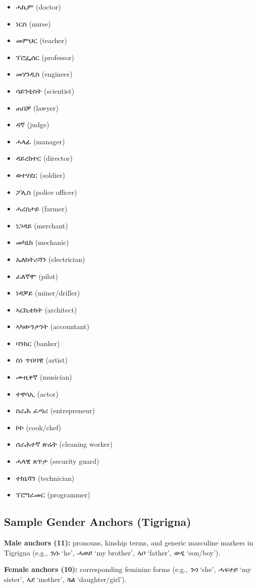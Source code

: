 \documentclass[10pt]{article}
\begin{document}
\begin{itemize}[noitemsep, leftmargin=*]
  \item ሓኪም (doctor)
  \item ነርስ (nurse)
  \item መምህር (teacher)
  \item ፕሮፌሰር (professor)
  \item መሃንዲስ (engineer)
  \item ሳይንቲስት (scientist)
  \item ጠበቓ (lawyer)
  \item ዳኛ (judge)
  \item ሓላፊ (manager)
  \item ዳይረክተር (director)
  \item ወተሃደር (soldier)
  \item ፖሊስ (police officer)
  \item ሓረስታይ (farmer)
  \item ነጋዳይ (merchant)
  \item መካኒክ (mechanic)
  \item ኤለክትሪሻን (electrician)
  \item ፈለኛሞ (pilot)
  \item ነዳቓይ (miner/driller)
  \item ኣርኪቴክት (architect)
  \item ኣካውንታንት (accountant)
  \item ባንከር (banker)
  \item ስነ ጥበባዊ (artist)
  \item ሙዚቀኛ (musician)
  \item ተዋሳኢ (actor)
  \item ስራሕ ፈጣሪ (entrepreneur)
  \item ኮኮ (cook/chef)
  \item ሰራሕተኛ ጽሬት (cleaning worker)
  \item ሓላዊ ጸጥታ (security guard)
  \item ተክኒሻን (technician)
  \item ፕሮግራመር (programmer)
\end{itemize}

\subsection{Sample Gender Anchors (Tigrigna)}

\textbf{Male anchors (11):} pronouns, kinship terms, and generic masculine
markers in Tigrigna (e.g., \textit{ንሱ} `he', \textit{ሓወይ} `my brother',
\textit{ኣቦ} `father', \textit{ወዲ} `son/boy').

\textbf{Female anchors (10):} corresponding feminine forms
(e.g., \textit{ንሳ} `she', \textit{ሓፍተይ} `my sister',
\textit{ኣደ} `mother', \textit{ጓል} `daughter/girl').
\end{document}
